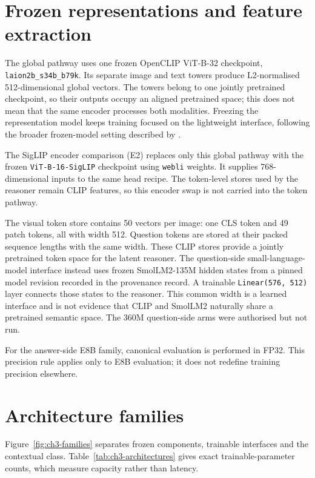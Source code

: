 \section{Frozen representations and feature extraction}
\label{sec:ch3-representations}
The global pathway uses one frozen OpenCLIP ViT-B-32 checkpoint, \texttt{laion2b\_s34b\_b79k}. Its separate image and text towers \citep{ilharco2021openclip} produce L2-normalised 512-dimensional global vectors. The towers belong to one jointly pretrained checkpoint, so their outputs occupy an aligned pretrained space; this does not mean that the same encoder processes both modalities.
Freezing the representation model keeps training focused on the lightweight interface, following the broader frozen-model setting described by \citet{tsimpoukelli2021frozen}.

\begingroup
\setlength{\emergencystretch}{2em}
The SigLIP encoder comparison (E2) replaces only this global pathway with the frozen \texttt{ViT-B-16-}\allowbreak\texttt{SigLIP} \citep{zhai2023siglip} checkpoint using \texttt{webli} weights. It supplies 768-dimensional inputs to the same head recipe. The token-level stores used by the reasoner remain CLIP features, so this encoder swap is not carried into the token pathway.\par
\endgroup

The visual token store contains 50 vectors per image: one CLS token and 49 patch tokens, all with width 512. Question tokens are stored at their packed sequence lengths with the same width. These CLIP stores provide a jointly pretrained token space for the latent reasoner. The question-side small-language-model interface instead uses frozen SmolLM2-135M hidden states \citep{benallal2025smollm2} from a pinned model revision recorded in the provenance record. A trainable \texttt{Linear(576, 512)} layer connects those states to the reasoner. This common width is a learned interface and is not evidence that CLIP and SmolLM2 naturally share a pretrained semantic space. The 360M question-side arms were authorised but not run.

For the answer-side E8B family, canonical evaluation is performed in FP32. This precision rule applies only to E8B evaluation; it does not redefine training precision elsewhere.

\section{Architecture families}
\label{sec:ch3-architectures}
Figure~\ref{fig:ch3-families} separates frozen components, trainable interfaces and the contextual class. Table~\ref{tab:ch3-architectures} gives exact trainable-parameter counts, which measure capacity rather than latency.

